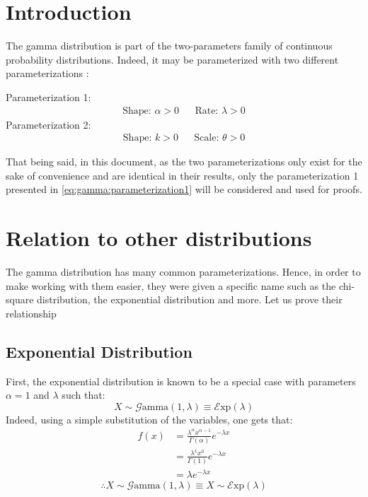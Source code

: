\documentclass[12pt]{article}
\newcommand{\G}{\mathcal{G}}
\newcommand{\E}{\mathcal{E}}
\begin{document}
\section{Introduction}
The gamma distribution is part of the two-parameters family of continuous probability distributions. Indeed, it may be
parameterized with two different parameterizations\cite{wikipediaGammaDistribution2022} :

\noindent Parameterization 1:
\vspace*{-24pt}
\begin{align}\label{eq:gamma:parameterization1}
	\text{Shape: } \alpha>0		&&	\text{Rate: }\lambda>0
\end{align}
Parameterization 2:
\vspace*{-24pt}
\begin{align}\label{eq:gamma:parameterization2}
	\text{Shape: } k>0			&&	\text{Scale: }\theta>0
\end{align}

That being said, in this document, as the two parameterizations only exist for the sake of convenience and are identical
in their results, only the parameterization 1 presented in \autoref{eq:gamma:parameterization1} will be considered and
used for proofs.

\pagebreak
\section{Relation to other distributions}
	The gamma distribution has many common parameterizations. Hence, in order to make working with them easier, they were
	given a specific name such as the chi-square distribution, the exponential distribution and more. Let us prove their
	relationship

\subsection{Exponential Distribution}
	First, the exponential distribution is known to be a special case with parameters $\alpha=1$ and $\lambda$ such that:
	\begin{equation*}
		X\sim\G\text{amma}(1, \lambda)\equiv\E\text{xp}(\lambda)
	\end{equation*}
	Indeed, using a simple substitution of the variables, one gets that:
	\begin{equation}\label{eq:relation:exp}
		\begin{split}
			f(x)	&=	\frac{\lambda^\alpha x^{\alpha-1}}{\Gamma(\alpha)}e^{-\lambda x}\\
					&=	\frac{\lambda^1 x^{0}}{\Gamma(1)}e^{-\lambda x}\\
					&=	\lambda e^{-\lambda x}
		\end{split}
	\end{equation}
	\begin{equation*}
		\therefore X\sim\G\text{amma}(1, \lambda)\equiv X\sim\E\text{xp}(\lambda)
	\end{equation*}
\end{document}
